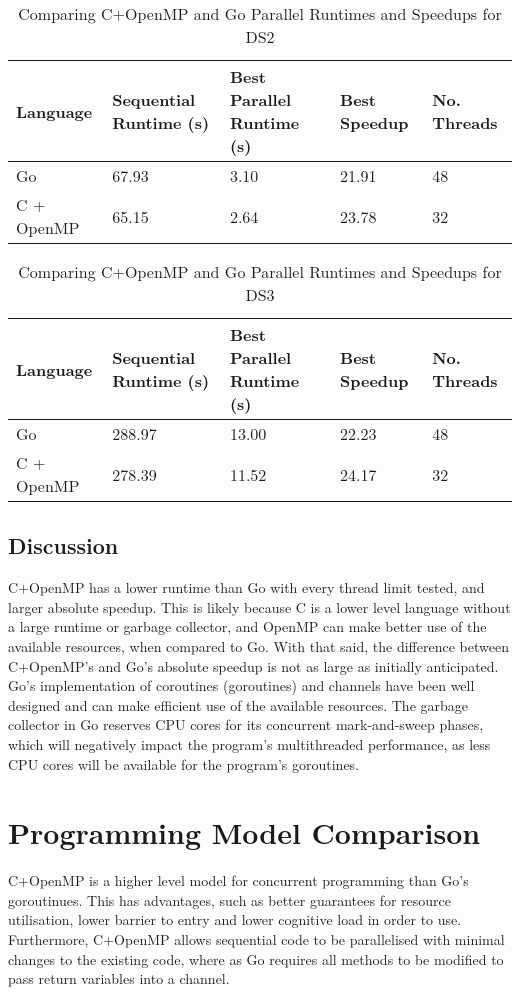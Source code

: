 \documentclass[11pt,a4paper,titlepage]{article}
\begin{document}
\begin{table}[!h]
	\centering
	\begin{tabulary}{\textwidth}{|L|L|L|L|L|}
		\hline
		Language & Sequential Runtime (s) & Best Parallel Runtime (s) & Best Speedup & No. Threads \\ \hline
		Go & 67.93 & 3.10 & 21.91 & 48 \\ \hline
		C + OpenMP & 65.15 & 2.64 & 23.78 & 32 \\ \hline
	\end{tabulary}
	\caption{Comparing C+OpenMP and Go Parallel Runtimes and Speedups for DS2}
\end{table}

\begin{table}[!h]
	\centering
	\begin{tabulary}{\textwidth}{|L|L|L|L|L|}
		\hline
		Language & Sequential Runtime (s) & Best Parallel Runtime (s) & Best Speedup & No. Threads \\ \hline
		Go & 288.97 & 13.00 & 22.23 & 48 \\ \hline
		C + OpenMP & 278.39 & 11.52 & 24.17 & 32 \\ \hline
	\end{tabulary}
	\caption{Comparing C+OpenMP and Go Parallel Runtimes and Speedups for DS3}
\end{table}

\FloatBarrier
\subsection{Discussion}
C+OpenMP has a lower runtime than Go with every thread limit tested, and larger absolute speedup.
This is likely because C is a lower level language without a large runtime or garbage collector, and OpenMP can make better use of the available resources, when compared to Go.
With that said, the difference between C+OpenMP's and Go's absolute speedup is not as large as initially anticipated.
Go's implementation of coroutines (goroutines) and channels have been well designed and can make efficient use of the available resources.
The garbage collector in Go reserves CPU cores for its concurrent mark-and-sweep phases, which will negatively impact the program's multithreaded performance, as less CPU cores will be available for the program's goroutines.

\section{Programming Model Comparison}
C+OpenMP is a higher level model for concurrent programming than Go's goroutinues.
This has advantages, such as better guarantees for resource utilisation, lower barrier to entry and lower cognitive load in order to use.
Furthermore, C+OpenMP allows sequential code to be parallelised with minimal changes to the existing code, where as Go requires all methods to be modified to pass return variables into a channel.
\end{document}
